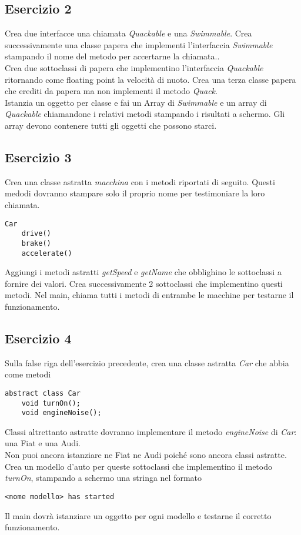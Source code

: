 \documentclass{article}
\begin{document}
\subsection*{Esercizio 2}
Crea due interfacce una chiamata \textit{Quackable} e una \textit{Swimmable}.
Crea successivamente una classe papera che implementi l'interfaccia \textit{Swimmable}
stampando il nome del metodo per accertarne la chiamata.. \\
Crea due sottoclassi di papera che implementino l'interfaccia \textit{Quackable} ritornando
come floating point la velocità di nuoto. Crea una terza classe papera che
erediti da papera ma non implementi il metodo \textit{Quack}.  \\
Istanzia un oggetto per classe e fai un Array di \textit{Swimmable} e un array 
di \textit{Quackable} chiamandone i relativi metodi stampando i risultati a schermo. 
Gli array devono contenere tutti gli oggetti che possono
starci.

\newpage
\subsection*{Esercizio 3}
Crea una classe astratta \textit{macchina} con i metodi riportati di seguito. 
Questi medodi dovranno stampare solo il proprio nome per testimoniare
la loro chiamata. \\
\begin{verbatim}
Car
    drive()
    brake()
    accelerate()
\end{verbatim}
Aggiungi i metodi astratti \textit{getSpeed} e \textit{getName} che obblighino
le sottoclassi a fornire dei valori. Crea successivamente 2 sottoclassi che
implementino questi metodi.
Nel main, chiama tutti i metodi di entrambe le macchine per testarne il funzionamento.

\subsection*{Esercizio 4}
Sulla false riga dell'esercizio precedente, crea una classe astratta
\textit{Car} che abbia come metodi
\begin{verbatim}
abstract class Car
    void turnOn();
    void engineNoise();
\end{verbatim}

Classi altrettanto astratte dovranno implementare il
metodo \textit{engineNoise} di \textit{Car}: una Fiat e una Audi. \\
Non puoi ancora istanziare ne Fiat ne Audi poiché sono ancora classi astratte. Crea un modello d'auto per queste
sottoclassi che implementino il metodo \textit{turnOn}, stampando a schermo una stringa
nel formato 
\begin{verbatim}
<nome modello> has started
\end{verbatim}
Il main dovrà istanziare un oggetto per ogni modello e testarne il corretto
funzionamento.
\end{document}
